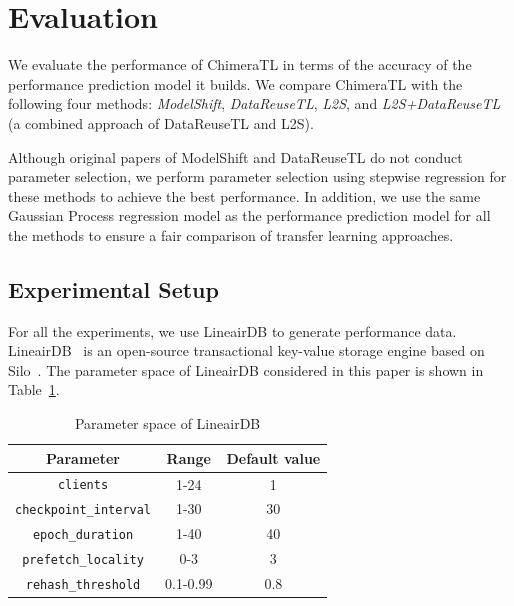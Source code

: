 \section{Evaluation}
\label{sec:eval}

We evaluate the performance of ChimeraTL in terms of the accuracy of the performance prediction model it builds.
We compare ChimeraTL with the following four methods: \textit{ModelShift}, \textit{DataReuseTL}, \textit{L2S}, and \textit{L2S+DataReuseTL} (a combined approach of DataReuseTL and L2S\cite{l2s}). 

Although original papers of ModelShift and DataReuseTL do not conduct parameter selection, we perform parameter selection using stepwise regression\cite{stepwise} for these methods to achieve the best performance.
In addition, we use the same Gaussian Process regression model as the performance prediction model for all the methods to ensure a fair comparison of transfer learning approaches.

\subsection{Experimental Setup}
\label{sec:eval:setup}
For all the experiments, we use LineairDB\cite{lineairdb} to generate performance data.
LineairDB~\cite{lineairdb} is an open-source transactional key-value storage engine based on Silo~\cite{silo}.
The parameter space of LineairDB considered in this paper is shown in Table~\ref{tab:lineairdb}.
\begin{table}[t]
    \caption{Parameter space of LineairDB}
    \label{tab:lineairdb}
    \centering
    \begin{tabular}{|c|c|c|}
        \hline
        \textbf{Parameter} & \textbf{Range} & \textbf{Default value} \\
        \hline
        \texttt{clients} & 1-24 & 1 \\
        \hline
        \texttt{checkpoint\_interval} & 1-30 & 30 \\
        \hline
        \texttt{epoch\_duration} & 1-40 & 40 \\
        \hline
        \texttt{prefetch\_locality} & 0-3 & 3 \\
        \hline
        \texttt{rehash\_threshold} & 0.1-0.99 & 0.8 \\
        \hline
    \end{tabular}
\end{table}

